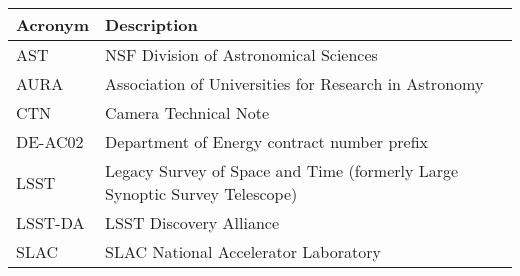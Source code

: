 \addtocounter{table}{-1}
\begin{longtable}{p{}p{}}\hline
\textbf{Acronym} & \textbf{Description}  \\\hline

AST & NSF Division of Astronomical Sciences \\\hline
AURA & Association of Universities for Research in Astronomy \\\hline
CTN & Camera Technical Note \\\hline
DE-AC02 & Department of Energy contract number prefix \\\hline
LSST & Legacy Survey of Space and Time (formerly Large Synoptic Survey Telescope) \\\hline
LSST-DA & LSST Discovery Alliance \\\hline
SLAC & SLAC National Accelerator Laboratory \\\hline
\end{longtable}
